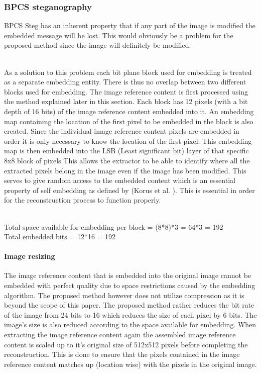 \documentclass[12pt]{article}
\begin{document}
\subsubsection{BPCS steganography} 
\label{bpcsSteg}

BPCS Steg has an inherent property that if any part of the image is modified the embedded message will be lost.
This would obviously be a problem for the proposed method since the image will definitely be modified.

\hspace{0pt} \\
As a solution to this problem each bit plane block used for embedding is treated as a separate embedding entity.
There is thus no overlap between two different blocks used for embedding.
The image reference content is first processed using the method explained later in this section.
Each block has 12 pixels (with a bit depth of 16 bits) of the image reference content embedded into it.
An embedding map containing the location of the first pixel to be embedded in the block is also created.
Since the individual image reference content pixels are embedded in order it is only necessary to know the location of the first pixel.
This embedding map is then embedded into the LSB (Least significant bit) layer of that specific 8x8 block of pixels 
This allows the extractor to be able to identify where all the extracted pixels belong in the image even if the image has been modified.
This serves to give random access to the embedded content which is an essential property of self embedding as defined by (Korus et al. \cite{korus2013efficient}).
This is essential in order for the reconstruction process to function properly.

\hspace{0pt} \\
Total space available for embedding per block = (8*8)*3 = 64*3 = 192
\hspace{0pt} \\
Total embedded bits = 12*16 = 192

\paragraph{Image resizing}
\label{ImageCompression}
The image reference content that is embedded into the original image cannot be embedded with perfect quality due to space restrictions caused by the embedding algorithm. 
The proposed method however does not utilize compression as it is beyond the scope of this paper.
The proposed method rather reduces the bit rate of the image from 24 bits to 16 which reduces the size of each pixel by 6 bits.
The image's size is also reduced according to the space available for embedding.
When extracting the image reference content again the assembled image reference content is scaled up to it's original size of 512x512 pixels before completing the reconstruction.
This is done to ensure that the pixels contained in the image reference content matches up (location wise) with the pixels in the original image.
\end{document}
